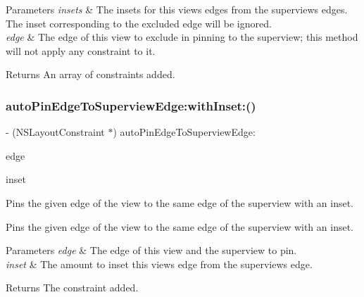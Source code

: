 \begin{DoxyParams}{Parameters}
{\em insets} & The insets for this view\textquotesingle{}s edges from the superview\textquotesingle{}s edges. The inset corresponding to the excluded edge will be ignored. \\
\hline
{\em edge} & The edge of this view to exclude in pinning to the superview; this method will not apply any constraint to it. \\
\hline
\end{DoxyParams}
\begin{DoxyReturn}{Returns}
An array of constraints added. 
\end{DoxyReturn}
\mbox{\label{category_u_i_view_07_auto_layout_08_a4c12119f7685e0f333ba70a38f6facd7}} 
\subsubsection{\texorpdfstring{auto\+Pin\+Edge\+To\+Superview\+Edge\+:with\+Inset\+:()}{autoPinEdgeToSuperviewEdge:withInset:()}}
{\footnotesize\ttfamily -\/ (N\+S\+Layout\+Constraint $\ast$) auto\+Pin\+Edge\+To\+Superview\+Edge\+: \begin{DoxyParamCaption}\item[{(A\+L\+Edge)}]{edge }\item[{withInset:(C\+G\+Float)}]{inset }\end{DoxyParamCaption}}

Pins the given edge of the view to the same edge of the superview with an inset.

Pins the given edge of the view to the same edge of the superview with an inset.


\begin{DoxyParams}{Parameters}
{\em edge} & The edge of this view and the superview to pin. \\
\hline
{\em inset} & The amount to inset this view\textquotesingle{}s edge from the superview\textquotesingle{}s edge. \\
\hline
\end{DoxyParams}
\begin{DoxyReturn}{Returns}
The constraint added. 
\end{DoxyReturn}
\mbox{\label{category_u_i_view_07_auto_layout_08_ae6859ea6905a3432b9efc0090fb027c7}} 
